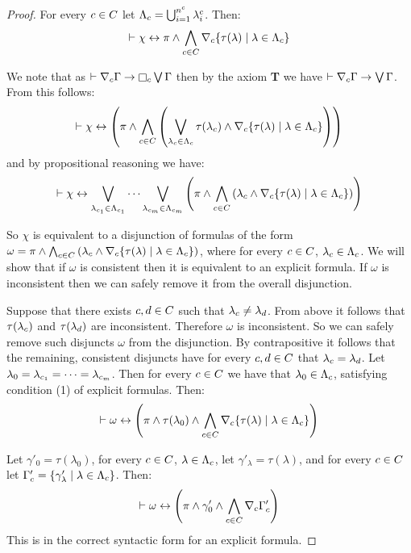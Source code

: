 \begin{proof}
For every $c \in C$ let $\Lambda_c = \bigcup_{i = 1}^{n^c} \lambda^c_i$.
Then:
$$
\vdash \chi \leftrightarrow \pi \land \bigwedge_{c \in C} \nabla_{c} \{\tau(\lambda) \mid \lambda \in \Lambda_c\}
$$

We note that as $\proves \coversC \Gamma \implies \necessaryC \bigvee \Gamma$ then by the \axiomS{} axiom {\bf T} we have $\vdash \nabla_{c} \Gamma \rightarrow \bigvee \Gamma$.
From this follows:
$$
\vdash \chi \leftrightarrow \left( \pi \land \bigwedge_{c \in C} \left(\bigvee_{\lambda_c \in \Lambda_c} \tau(\lambda_c) \land \nabla_{c} \{\tau(\lambda) \mid \lambda \in \Lambda_c\}\right) \right)
$$
and by propositional reasoning we have:
$$
\vdash \chi \leftrightarrow \bigvee_{\lambda_{c_1} \in \Lambda_{c_1}} \cdots \bigvee_{\lambda_{c_m} \in \Lambda_{c_m}} \left(\pi \land \bigwedge_{c \in C} \left(\lambda_c \land \nabla_{c} \{\tau(\lambda) \mid \lambda \in \Lambda_c\} \right) \right)
$$

So $\chi$ is equivalent to a disjunction of formulas of the form $\omega = \pi \land \bigwedge_{c \in C} \left(\lambda_c \land \nabla_{c} \{\tau(\lambda) \mid \lambda \in \Lambda_c\} \right)$, where for every $c \in C$, $\lambda_c \in \Lambda_c$.
We will show that if $\omega$ is consistent then it is equivalent to an explicit formula.
If $\omega$ is inconsistent then we can safely remove it from the overall disjunction.

Suppose that there exists $c, d \in C$ such that $\lambda_c \neq \lambda_d$.
From above it follows that $\tau(\lambda_c)$ and $\tau(\lambda_d)$ are inconsistent.
Therefore $\omega$ is inconsistent.
So we can safely remove such disjuncts $\omega$ from the disjunction.
By contrapositive it follows that the remaining, consistent disjuncts have for every $c, d \in C$ that $\lambda_c = \lambda_d$.
Let $\lambda_0 = \lambda_{c_1} = \cdots = \lambda_{c_m}$.
Then for every $c \in C$ we have that $\lambda_0 \in \Lambda_c$, satisfying condition (1) of explicit formulas.
Then:
$$
\vdash \omega \leftrightarrow \left( \pi \land \tau(\lambda_0) \land \bigwedge_{c \in C} \nabla_{c} \{\tau(\lambda) \mid \lambda \in \Lambda_c\} \right)
$$

Let $\gamma'_0 = \tau(\lambda_0)$, for every $c \in C$, $\lambda \in \Lambda_c$, let $\gamma'_\lambda = \tau(\lambda)$, and for every $c \in C$ let $\Gamma'_c = \{\gamma'_\lambda \mid \lambda \in \Lambda_c\}$.
Then:
$$
\vdash \omega \leftrightarrow \left( \pi \land \gamma'_0 \land \bigwedge_{c \in C} \nabla_{c} \Gamma'_c \right)
$$
This is in the correct syntactic form for an explicit formula.


\end{proof}
